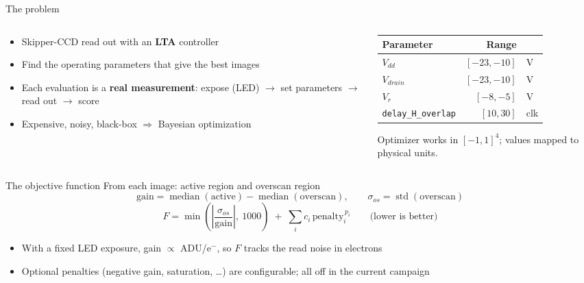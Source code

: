\documentclass[aspectratio=169,10pt]{beamer}
\begin{document}
\begin{frame}{The problem}
  \begin{columns}[T]
    \begin{column}{0.52\textwidth}
      \begin{itemize}
        \item Skipper-CCD read out with an \textbf{LTA} controller
        \item Find the operating parameters that give the best images
        \item Each evaluation is a \textbf{real measurement}:
              expose (LED) $\rightarrow$ set parameters $\rightarrow$ read out
              $\rightarrow$ score
        \item Expensive, noisy, black-box $\Rightarrow$ Bayesian optimization
      \end{itemize}
    \end{column}
    \begin{column}{0.44\textwidth}
      \centering\small
      \begin{tabular}{lrl}
        \toprule
        Parameter & Range & \\
        \midrule
        $V_{dd}$         & $[-23,-10]$ & V \\
        $V_{drain}$      & $[-23,-10]$ & V \\
        $V_{r}$          & $[-8,-5]$   & V \\
        \texttt{delay\_H\_overlap} & $[10,30]$ & clk \\
        \bottomrule
      \end{tabular}

      \vspace{2mm}
      {\scriptsize Optimizer works in $[-1,1]^4$; values mapped to physical units.}
    \end{column}
  \end{columns}
\end{frame}

\begin{frame}{The objective function}
  From each image: active region and overscan region
  \[
    \text{gain} = \operatorname{median}(\text{active}) - \operatorname{median}(\text{overscan}),
    \qquad
    \sigma_{os} = \operatorname{std}(\text{overscan})
  \]
  \[
    F = \min\!\left(\left|\frac{\sigma_{os}}{\text{gain}}\right|,\ 1000\right)
        \;+\; \sum_i c_i\,\text{penalty}_i^{\,p_i}
    \qquad\text{(lower is better)}
  \]
  \begin{itemize}
    \item With a fixed LED exposure, gain $\propto$ ADU/e$^-$, so $F$ tracks the
          read noise in electrons
    \item Optional penalties (negative gain, saturation, \dots) are configurable;
          all off in the current campaign
  \end{itemize}
\end{frame}
\end{document}
